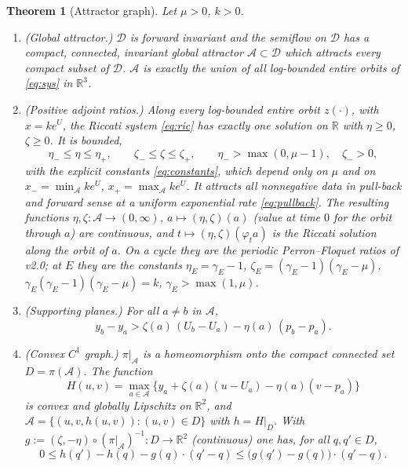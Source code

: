 \documentclass[11pt,a4paper]{article}
\numberwithin{equation}{section}
\newtheorem{theorem}{Theorem}[section]
\theoremstyle{remark}\newtheorem{remark}[theorem]{Remark}
\newcommand{\R}{\mathbb R}
\newcommand{\cA}{\mathcal A}
\newcommand{\cD}{\mathcal D}
\begin{document}
\begin{theorem}[Attractor graph]\label{thm:A}
Let $\mu>0$, $k>0$.
\begin{enumerate}[label=\textup{(A\arabic*)}]
\item \textup{(Global attractor.)} $\cD$ is forward invariant and the semiflow on $\cD$ has a compact, connected,
invariant global attractor $\cA\subset\cD$ which attracts every compact subset of $\cD$. $\cA$ is exactly the union
of all log-bounded entire orbits of \eqref{eq:sys} in $\R^3$.
\item \textup{(Positive adjoint ratios.)} Along every log-bounded entire orbit $z(\cdot)$, with $x=ke^{U}$, the
Riccati system \eqref{eq:ric} has exactly one solution on $\R$ with $\eta\ge0$, $\zeta\ge0$. It is bounded,
\begin{equation}\label{eq:bounds}
\eta_-\le\eta\le\eta_+,\qquad \zeta_-\le\zeta\le\zeta_+,\qquad \eta_->\max(0,\mu-1),\quad \zeta_->0,
\end{equation}
with the explicit constants \eqref{eq:constants}, which depend only on $\mu$ and on
$x_-=\min_{\cA}ke^{U}$, $x_+=\max_{\cA}ke^{U}$. It attracts all nonnegative data in pull-back and forward sense at
a uniform exponential rate \eqref{eq:pullback}. The resulting functions $\eta,\zeta:\cA\to(0,\infty)$,
$a\mapsto(\eta,\zeta)(a)$ (value at time $0$ for the orbit through $a$) are continuous, and
$t\mapsto(\eta,\zeta)(\varphi_t a)$ is the Riccati solution along the orbit of $a$. On a cycle they are the
periodic Perron--Floquet ratios of v2.0; at $E$ they are the constants $\eta_E=\gamma_E-1$,
$\zeta_E=(\gamma_E-1)(\gamma_E-\mu)$, $\gamma_E(\gamma_E-1)(\gamma_E-\mu)=k$, $\gamma_E>\max(1,\mu)$.
\item \textup{(Supporting planes.)} For all $a\neq b$ in $\cA$,
\begin{equation}\label{eq:support}
y_b-y_a>\zeta(a)\,(U_b-U_a)-\eta(a)\,(p_b-p_a).
\end{equation}
\item \textup{(Convex $C^1$ graph.)} $\pi|_{\cA}$ is a homeomorphism onto the compact connected set $D=\pi(\cA)$.
The function
\[
H(u,v)=\max_{a\in\cA}\bigl\{y_a+\zeta(a)(u-U_a)-\eta(a)(v-p_a)\bigr\}
\]
is convex and globally Lipschitz on $\R^2$, and $\cA=\{(u,v,h(u,v)):(u,v)\in D\}$ with $h=H|_D$. With
$g:=(\zeta,-\eta)\circ(\pi|_\cA)^{-1}:D\to\R^2$ (continuous) one has, for all $q,q'\in D$,
\begin{equation}\label{eq:whitney}
0\le h(q')-h(q)-g(q)\cdot(q'-q)\le\bigl(g(q')-g(q)\bigr)\cdot(q'-q).
\end{equation}

\end{enumerate}
\end{theorem}
\end{document}
